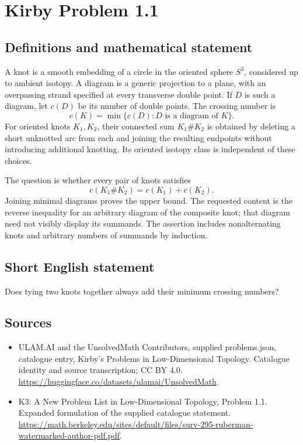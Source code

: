 \documentclass[11pt,a4paper]{article}
\begin{document}
\section*{Kirby Problem 1.1}\label{statement}

\subsection{Definitions and mathematical statement}
A knot is a smooth embedding of a circle in the oriented sphere $S^3$, considered
up to ambient isotopy. A diagram is a generic projection to a plane, with an
overpassing strand specified at every transverse double point. If $D$ is such a
diagram, let $c(D)$ be its number of double points. The crossing number is
\[
c(K)=\min\{c(D):D\text{ is a diagram of }K\}.
\]
For oriented knots $K_1,K_2$, their connected sum $K_1\#K_2$ is obtained by deleting
a short unknotted arc from each and joining the resulting endpoints without
introducing additional knotting. Its oriented isotopy class is independent of
these choices.

The question is whether every pair of knots satisfies
\[
c(K_1\#K_2)=c(K_1)+c(K_2).
\]
Joining minimal diagrams proves the upper bound. The requested content is the
reverse inequality for an arbitrary diagram of the composite knot; that diagram
need not visibly display its summands. The assertion includes nonalternating knots
and arbitrary numbers of summands by induction.
\subsection{Short English statement}
Does tying two knots together always add their minimum crossing numbers?
\subsection{Sources}
\begin{itemize}
\item[S1] ULAM.AI and the UnsolvedMath Contributors, supplied problems.json, catalogue entry, Kirby's Problems in Low-Dimensional Topology. Catalogue identity and source transcription; CC BY 4.0.
\url{https://huggingface.co/datasets/ulamai/UnsolvedMath}.
\item[S2] K3: A New Problem List in Low-Dimensional Topology, Problem 1.1. Expanded formulation of the supplied catalogue statement.
\url{https://math.berkeley.edu/sites/default/files/surv-295-ruberman-watermarked-author-pdf.pdf}.
\end{itemize}
\end{document}
